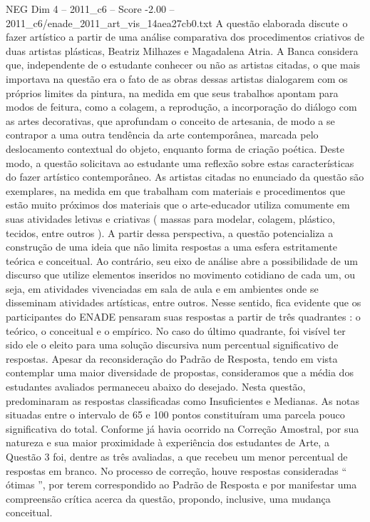 \begin{textsample}{NEG Dim 4 – 2011\_c6 – Score -2.00 – 2011\_c6/enade\_2011\_art\_vis\_14aea27cb0.txt}
A questão elaborada discute o fazer artístico a partir de uma análise comparativa dos procedimentos criativos de duas artistas plásticas, Beatriz Milhazes e Magadalena Atria.
A Banca considera que, independente de o estudante conhecer ou não as artistas citadas, o que mais importava na questão era o fato de as obras dessas artistas dialogarem com os próprios limites da pintura, na medida em que seus trabalhos apontam para modos de feitura, como a colagem, a reprodução, a incorporação do diálogo com as artes decorativas, que aprofundam o conceito de artesania, de modo a se contrapor a uma outra tendência da arte contemporânea, marcada pelo deslocamento contextual do objeto, enquanto forma de criação poética.
Deste modo, a questão solicitava ao estudante uma reflexão sobre estas características do fazer artístico contemporâneo.
As artistas citadas no enunciado da questão são exemplares, na medida em que trabalham com materiais e procedimentos que estão muito próximos dos materiais que o arte-educador utiliza comumente em suas atividades letivas e criativas ( massas para modelar, colagem, plástico, tecidos, entre outros ).
A partir dessa perspectiva, a questão potencializa a construção de uma ideia que não limita respostas a uma esfera estritamente teórica e conceitual.
Ao contrário, seu eixo de análise abre a possibilidade de um discurso que utilize elementos inseridos no movimento cotidiano de cada um, ou seja, em atividades vivenciadas em sala de aula e em ambientes onde se disseminam atividades artísticas, entre outros.
Nesse sentido, fica evidente que os participantes do ENADE pensaram suas respostas a partir de três quadrantes : o teórico, o conceitual e o empírico.
No caso do último quadrante, foi visível ter sido ele o eleito para uma solução discursiva num percentual significativo de respostas.
Apesar da reconsideração do Padrão de Resposta, tendo em vista contemplar uma maior diversidade de propostas, consideramos que a média dos estudantes avaliados permaneceu abaixo do desejado.
Nesta questão, predominaram as respostas classificadas como Insuficientes e Medianas.
As notas situadas entre o intervalo de 65 e 100 pontos constituíram uma parcela pouco significativa do total.
Conforme já havia ocorrido na Correção Amostral, por sua natureza e sua maior proximidade à experiência dos estudantes de Arte, a Questão 3 foi, dentre as três avaliadas, a que recebeu um menor percentual de respostas em branco.
No processo de correção, houve respostas consideradas “ ótimas ”, por terem correspondido ao Padrão de Resposta e por manifestar uma compreensão crítica acerca da questão, propondo, inclusive, uma mudança conceitual.

\end{textsample}
